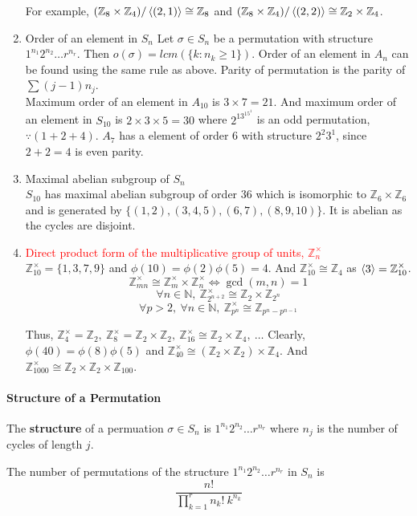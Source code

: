 \begin{enumerate}
		For example, $(\mathbb{Z}_8 \times \mathbb{Z}_4)/\left\langle (2,1) \right\rangle \cong \mathbb{Z}_8$ and $(\mathbb{Z}_8 \times \mathbb{Z}_4)/\left\langle (2,2) \right\rangle \cong \mathbb{Z}_2 \times \mathbb{Z}_4$.
	\item Order of an element in $S_n$
		Let $\sigma \in S_n$ be a permutation with structure $1^{n_1}2^{n_2}\dots r^{n_r}$.
		Then $o(\sigma) = lcm(\{k : n_k \ge 1 \})$.
		Order of an element in $A_n$ can be found using the same rule as above. Parity of permutation is the parity of $\sum (j-1)n_j$.\\
		Maximum order of an element in $A_{10}$ is $3 \times 7 = 21$. And maximum order of an element in $S_{10}$ is $2 \times 3 \times 5 = 30$ where $2^13^15^1$ is an odd permutation, $\because (1+2+4)$.
		\subitem $A_7$ has a element of order $6$ with structure $2^2 3^1$, since $2+2 = 4$ is even parity.
	\item Maximal abelian subgroup of $S_n$\\
		$S_{10}$ has maximal abelian subgroup of order $36$ which is isomorphic to $\mathbb{Z}_6 \times \mathbb{Z}_6$ and is generated by $\{ (1,2),(3,4,5),(6,7),(8,9,10)\}$. It is abelian as the cycles are disjoint.
	\item \textcolor{red}{Direct product form of the multiplicative group of units, $\mathbb{Z}_n^\times$}\\
	$\mathbb{Z}_{10}^\times=\{1,3,7,9\}$ and $\phi(10)=\phi(2)\phi(5)=4$.
		And $\mathbb{Z}_{10}^\times \cong \mathbb{Z}_4$ as $\left\langle 3 \right\rangle = \mathbb{Z}_{10}^\times$.
		$$\mathbb{Z}_{mn}^\times \cong \mathbb{Z}_m^\times \times \mathbb{Z}_n^\times \iff \gcd(m,n) = 1$$
		$$\forall n \in \mathbb{N},\ \mathbb{Z}_{2^{n+2}}^\times \cong \mathbb{Z}_2 \times \mathbb{Z}_{2^n}$$
		$$\forall p > 2,\ \forall n \in \mathbb{N},\ \mathbb{Z}_{p^n}^\times \cong \mathbb{Z}_{p^n-p^{n-1}}$$

		Thus, $\mathbb{Z}_4^\times = \mathbb{Z}_2,\ \mathbb{Z}_8^\times = \mathbb{Z}_2 \times \mathbb{Z}_2,\ \mathbb{Z}_{16}^\times \cong \mathbb{Z}_2 \times \mathbb{Z}_4,\ \dots$
		Clearly, $\phi(40) = \phi(8)\phi(5)$ and $\mathbb{Z}_{40}^\times \cong (\mathbb{Z}_2 \times \mathbb{Z}_2) \times \mathbb{Z}_4$.
		And $\mathbb{Z}_{1000}^\times \cong \mathbb{Z}_2 \times \mathbb{Z}_2 \times \mathbb{Z}_{100}$.
\end{enumerate}


\paragraph{Structure of a Permutation}
\begin{definition}
	The \textbf{structure} of a permuation $\sigma \in S_n$ is $1^{n_1} 2^{n_2} \dots r^{n_r}$ where $n_j$ is the number of cycles of length $j$.
\end{definition}
	The number of permutations of the structure $1^{n_1} 2^{n_2} \dots r^{n_r}$ in $S_n$ is
	$$ \frac{n!}{\prod_{k=1}^r n_k!\ k^{n_k}}$$


